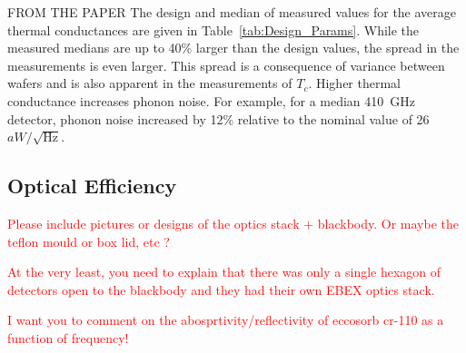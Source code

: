 FROM THE PAPER
The design and median of measured values for the average thermal conductances are given in Table~\ref{tab:Design_Params}. While the 
measured medians are up to 40\% larger than the design values, the spread in the measurements is even larger. This spread is 
a consequence of variance between wafers and is also apparent in the measurements of $T_{c}$. 
Higher thermal conductance increases phonon noise. For example, for a median 410~GHz detector, phonon noise increased by 
12\% relative to the nominal value of 26~$aW/\sqrt{\mathrm{Hz}}$. 



\subsection{Optical Efficiency}
\label{sec:optical_efficiency}

%

\textcolor{red}{Please include pictures or designs of the optics stack + blackbody. Or maybe the teflon mould or box lid, etc ?}

\textcolor{red}{At the very least, you need to explain that there was only a single hexagon of detectors open to the blackbody and they had their own EBEX optics stack.}


\textcolor{red}{I want you to comment on the abosprtivity/reflectivity of eccosorb cr-110 as a function of frequency!}


